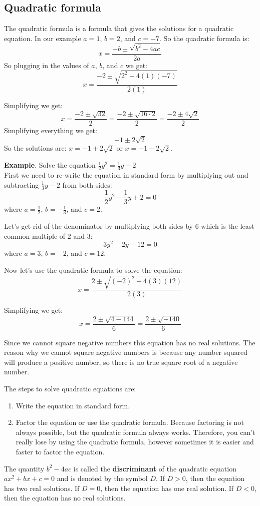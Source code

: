 \subsection{Quadratic formula}
The quadratic formula is a formula that gives the solutions for a quadratic equation. In our example $a = 1$, $b = 2$, and $c = -7$. So the quadratic formula is:
$$x=\frac{-b \pm \sqrt{b^2-4ac}}{2a}$$
So plugging in the values of $a$, $b$, and $c$ we get:
$$x=\frac{-2 \pm \sqrt{2^2-4(1)(-7)}}{2(1)}$$

Simplifying we get:
$$x=\frac{-2 \pm \sqrt{32}}{2} = \frac{-2\pm\sqrt{16\cdot2}}{2} = \frac{-2\pm4\sqrt{2}}{2} $$
Simplifying everything we get: 
$$ -1\pm2\sqrt{2} $$
So the solutions are: $x=-1+2\sqrt{2}$ or $x=-1-2\sqrt{2}$.

\textbf{Example}. Solve the equation $\frac{1}{2}y^2 = \frac{1}{3}y-2$ \\

First we need to re-write the equation in standard form by multiplying out and subtracting $\frac{1}{3}y-2$ from both sides:
$$\frac{1}{2}y^2-\frac{1}{3}y+2=0$$ where $a=\frac{1}{2}$, $b=-\frac{1}{3}$, and $c=2$.

Let's get rid of the denominator by multiplying both sides by $6$ which is the least common multiple of $2$ and $3$:
$$3y^2-2y+12=0$$ where $a=3$, $b=-2$, and $c=12$.

Now let's use the quadratic formula to solve the equation:
$$x=\frac{2\pm\sqrt{(-2)^2-4(3)(12)}}{2(3)}$$

Simplifying we get:
$$x=\frac{2\pm\sqrt{4-144}}{6} = \frac{2\pm\sqrt{-140}}{6}$$

Since we cannot square negative numbers this equation has no real solutions. 
The reason why we cannot square negative numbers is because any number squared will produce a positive number, so there is no true square root of a negative number.

The steps to solve quadratic equations are:
\begin{enumerate}
    \item Write the equation in standard form.
    \item Factor the equation or use the quadratic formula. Because factoring is not always possible, but the quadratic formula always works. Therefore, you can't really lose by using the quadratic formula, however sometimes it is easier and faster to factor the equation.
\end{enumerate}

The quantity $b^2-4ac$ is called the \textbf{discriminant} of the quadratic equation $ax^2+bx+c=0$ and is denoted by the symbol $D$. If $D>0$, then the equation has two real solutions. If $D=0$, then the equation has one real solution. If $D<0$, then the equation has no real solutions. 

